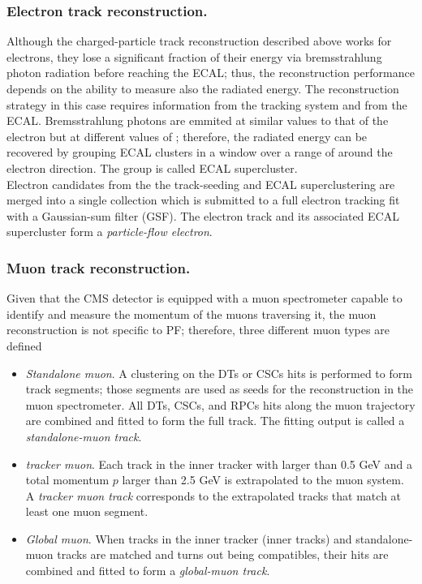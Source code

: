 \subsubsection*{Electron track reconstruction.}

\noindent Although the charged-particle track reconstruction described above works for electrons, they lose a significant fraction of their energy via bremsstrahlung photon radiation before reaching the ECAL; thus, the reconstruction performance depends on the ability to measure also the radiated energy. The reconstruction strategy in this case requires information from the tracking system and from the ECAL. Bremsstrahlung photons are emmited at similar \etac values to that of the electron but at different values of \phic; therefore, the radiated energy can be recovered by grouping ECAL clusters in a \etac window over a range of \phic around the electron direction. The group is called ECAL supercluster.\\

\noindent Electron candidates from the the track-seeding and  ECAL superclustering are merged into a single collection which is submitted to a full electron tracking fit with a Gaussian-sum filter (GSF)\cite{gsf}. The electron track and its associated ECAL supercluster form a \textit{particle-flow electron}.

\subsubsection*{Muon track reconstruction.}

\noindent Given that the CMS detector is equipped with a muon spectrometer capable to identify and measure the momentum of the muons traversing it, the muon reconstruction is not specific to PF; therefore, three different muon types are defined

\begin{itemize}
\item \textit{Standalone muon}. A clustering on the DTs or CSCs hits is performed to form track segments; those segments are used as seeds for the reconstruction in the muon spectrometer. All DTs, CSCs, and RPCs hits along the muon trajectory are combined and fitted to form the full track. The fitting output is called a \textit{standalone-muon track}.
\item \textit{tracker muon}. Each track in the inner tracker with \pt larger than 0.5 GeV and a total momentum $p$ larger than 2.5 GeV is extrapolated to the muon system. A \textit{tracker muon track} corresponds to the extrapolated tracks that match at least one muon segment.
\item \textit{Global muon}. When tracks in the inner tracker (inner tracks) and standalone-muon tracks are matched and turns out being compatibles, their hits are combined and fitted to form a \textit{global-muon track}. 
\end{itemize}

